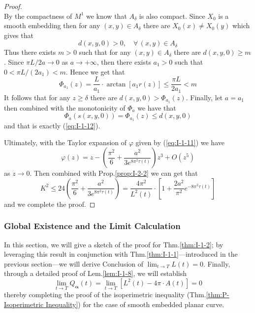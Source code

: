 \begin{proof}
\begin{equation*}
    \end{equation*}
    By the compactness of $M^1$ we know that $A_\delta$ is also compact. Since $X_0$ is a smooth embedding then for any $(x,y)\in A_\delta$ there are $X_0(x)\neq X_0(y)$ which gives that
    \begin{equation*}
        d(x,y,0)>0,\quad\forall\,(x,y)\in A_\delta
    \end{equation*}
    Thus there exists $m>0$ such that for any $(x,y)\in A_\delta$ there are $d(x,y,0)\ge m$. Since $\pi L/2a\to 0$ as $a\to+\infty$, then there exists $a_1>0$ such that $0<\pi L/(2a_1)<m$. Hence we get that
    \begin{equation*}
        \Phi_{a_1}(z)=\frac{L}{a_1}\cdot\arctan{[a_1 r(z)]}\le\frac{\pi L}{2a_1}<m
    \end{equation*}
    It follows that for any $z\ge\delta$ there are $d(x,y,0)>\Phi_{a_1}(z)$. Finally, let $a=a_1$ then combined with the monotonicity of $\Phi_a$ we have that
    \begin{equation*}
        \Phi_a(s(x,y,0))=\Phi_{a_1}(z)\le d(x,y,0)
    \end{equation*}
    and that is exactly (\ref{eq:I-1-12}).

    Ultimately, with the Taylor expansion of $\varphi$ given by (\ref{eq:I-1-11}) we have
    \begin{equation*}
        \varphi(z)=z-\left(\frac{\pi^2}{6}+\frac{a^2}{3e^{8\pi^2\tau(t)}}\right)z^3+O(z^5)
    \end{equation*}
    as $z\to 0$. Then combined with Prop.\ref{prop:I-2-2} we can get that
    \begin{equation*}
        K^2\le 24\left(\frac{\pi^2}{6}+\frac{a^2}{3e^{8\pi^2\tau(t)}}\right)=\frac{4\pi^2}{L^2(t)}\cdot\left[1+\frac{2a^2}{\pi^2}e^{-8\pi^2\tau{(t)}}\right]
    \end{equation*}
    and we complete the proof.
\end{proof}

\subsubsection{Global Existence and the Limit Calculation}

In this section, we will give a sketch of the proof for Thm.\ref{thm:I-1-2}; by leveraging this result in conjunction with Thm.\ref{thm:I-1-1}—introduced in the previous section—we will derive Conclusion of $\lim_{t\to T}L(t)=0$. Finally, through a detailed proof of Lem.\ref{lem:I-1-8}, we will establish
\begin{equation*}
    \lim_{t\to T}Q_{\boldsymbol{\alpha}}(t)=\lim_{t\to T}\left[L^2(t)-4\pi\cdot A(t)\right]=0
\end{equation*}
thereby completing the proof of the isoperimetric inequality (Thm.\ref{thm:P-Isoperimetric Inequality}) for the case of smooth embedded planar curve.

